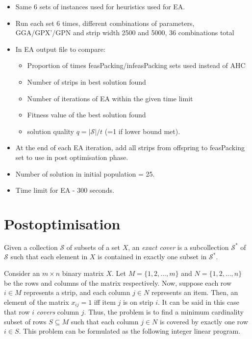 \documentclass{elsarticle}
\begin{document}
{\color{myRed}
\begin{itemize}[leftmargin=*]
	\item Same 6 sets of instances used for heuristics used for EA.
	\item Run each set 6 times, different combinations of parameters, GGA/GPX'/GPN and strip width 2500 and 5000, 36 combinations total
	\item In EA output file to compare:
	\begin{itemize}[leftmargin=*]
		\item Proportion of times feasPacking/infeasPacking sets used instead of AHC
		\item Number of strips in best solution found
		\item Number of iterations of EA within the given time limit
		\item Fitness value of the best solution found
		\item solution quality $q = |\mathcal{S}|/t$ (=1 if lower bound met).
	\end{itemize}
	\item At the end of each EA iteration, add all strips from offspring to feasPacking set to use in post optimisation phase.
	\item Number of solution in initial population = 25.
	\item Time limit for EA - 300 seconds.
\end{itemize}
}


\section{Postoptimisation}
\label{sec:postopt}
\noindent Given a collection $\mathcal{S}$ of subsets of a set $X$, an \emph{exact cover} is a subcollection $\mathcal{S}^*$ of $\mathcal{S}$ such that each element in $X$ is contained in exactly one subset in $\mathcal{S}^*$.

Consider an $m\times n$ binary matrix $X$. Let $M = \{1,2,\dotsc,m\}$ and $N = \{1,2,\dotsc,n\}$ be the rows and columns of the matrix respectively. Now, suppose each row $i \in M$ represents a strip, and each column $j \in N$ represents an item. Then, an element of the matrix $x_{ij} = 1$ iff item $j$ is on strip $i$. It can be said in this case that row $i$ \emph{covers} column $j$. Thus, the problem is to find a minimum cardinality subset of rows $S \subseteq M$ such that each column $j \in N$ is covered by exactly one row $i \in S$. This problem can be formulated as the following integer linear program.
\end{document}
